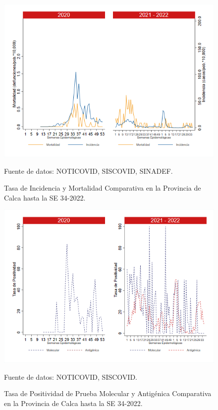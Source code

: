\documentclass[12pt,a4paper,openany]{book}
\begin{document}
	
	\begin{figure}[h]
		\caption{Tasa de Incidencia y Mortalidad Comparativa en la Provincia de Calca hasta la SE 34-2022.}\label{fig:inc_mort_calca}
		\begin{center}
			\includegraphics[width=0.85\linewidth]{../figuras/incidencia_mortalidad_20_21_3.png}
		\end{center}
		{\footnotesize {Fuente de datos: NOTICOVID, SISCOVID, SINADEF.}}
	\end{figure}
	
	\begin{figure}[h]
		\caption{Tasa de Positividad de Prueba Molecular y Antigénica Comparativa en la Provincia de Calca hasta la SE 34-2022.}\label{fig:positividad_calca}
		\begin{center}
			\includegraphics[width=0.7\linewidth]{../figuras/positividad_20_21_3.png}
		\end{center}
		{\footnotesize {Fuente de datos: NOTICOVID, SISCOVID.}}
	\end{figure}
	
\end{document}
